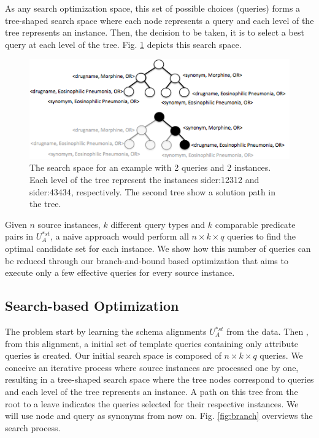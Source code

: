 As any search optimization space, this set of possible choices (queries) forms a tree-shaped search space where each node represents a query and each level of the tree represents an instance. Then, the decision to be taken, it is to select a best query at each level of the tree. Fig. \ref{fig:sspace} depicts this search space.

\begin{figure} [h]
\vspace{-10pt}
\centering
\includegraphics[scale=0.5]{p22.png}
\caption{The search space for an example with 2 queries and 2 instances. Each level of the tree represent the instances sider:12312 and sider:43434, respectively. The second tree show a solution path in the tree.} 
\vspace{-10pt}
\label{fig:sspace}
\end{figure}

Given $n$ source instances, $k$ different query types and $k$ comparable predicate pairs in $U^{*st}_A$, a naive approach would perform all $n \times k \times q$ queries to find the optimal candidate set for each instance. We show how this number of queries can be reduced through our branch-and-bound based optimization that aims to execute only a few effective queries for every source instance. 
 
\subsection{Search-based Optimization} 
The problem start by learning the schema alignments $U^{*st}_A$ from the data. Then , from this alignment, a initial set of template queries containing only attribute queries is created. Our initial search space is composed of $n \times k \times q$ queries. We conceive an iterative process where source instances are processed one by one, resulting in a tree-shaped search space where the tree nodes correspond to queries and each level of the tree represents an instance.  A path on this tree from the root to a leave indicates the queries selected for their respective instances. We will use node and query as synonyms from now on. Fig. \ref{fig:branch} overviews the search process.

